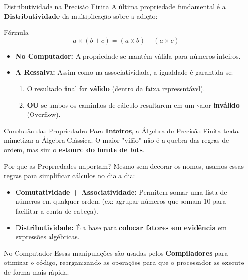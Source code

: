 \begin{frame}{Distributividade na Precisão Finita}
    A última propriedade fundamental é a \textbf{Distributividade} da multiplicação sobre a adição:

    \begin{block}{Fórmula}
        $$ a \times (b + c) = (a \times b) + (a \times c) $$
    \end{block}

    \begin{itemize}
        \item \textbf{No Computador:} A propriedade se mantém válida para números inteiros.
        \item \textbf{A Ressalva:} Assim como na associatividade, a igualdade é garantida se:
              \begin{enumerate}
                  \item O resultado final for \textbf{válido} (dentro da faixa representável).
                  \item \textbf{OU} se ambos os caminhos de cálculo resultarem em um valor \textbf{inválido} (Overflow).
              \end{enumerate}
    \end{itemize}

    \begin{alertblock}{Conclusão das Propriedades}
        Para \textbf{Inteiros}, a Álgebra de Precisão Finita tenta mimetizar a Álgebra Clássica. O maior "vilão" não é a quebra das regras de ordem, mas sim o \textbf{estouro do limite de bits}.
    \end{alertblock}
\end{frame}

\begin{frame}{Por que as Propriedades importam?}
    Mesmo sem decorar os nomes, usamos essas regras para simplificar cálculos no dia a dia:

    \begin{itemize}
        \item \textbf{Comutatividade + Associatividade:} Permitem somar uma lista de números em qualquer ordem (ex: agrupar números que somam 10 para facilitar a conta de cabeça).
        \item \textbf{Distributividade:} É a base para \textbf{colocar fatores em evidência} em expressões algébricas.
    \end{itemize}

    \begin{block}{No Computador}
        Essas manipulações são usadas pelos \textbf{Compiladores} para otimizar o código, reorganizando as operações para que o processador as execute de forma mais rápida.
    \end{block}
\end{frame}

